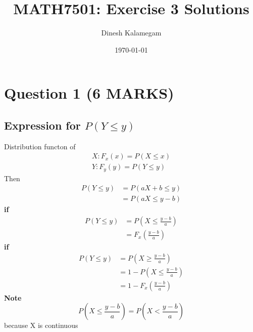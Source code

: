 \documentclass[11pt]{article}
\begin{document}
\title{MATH7501: Exercise 3 Solutions}
\author{Dinesh Kalamegam}
\date{\today}
\maketitle

\newtheorem{theorem}{Theorem}[section]
\newtheorem{definition}[theorem]{Defintion}
\newtheorem{proposition}[theorem]{Proposition}
\newtheorem{corollary}[theorem]{Corollary}

\section{Question 1 (6 MARKS)}
\subsection{Expression for $P(Y\leq y)$}
Distribution functon of
\begin{align*}
    X: F_{x}(x) = P(X \leq x) \\
    Y: F_{y}(y) = P(Y \leq y)
\end{align*}
Then
\begin{align*}
    P(Y \leq y ) &= P(aX+b \leq y) \\
                 &= P(aX \leq y-b)
\end{align*}
\textbf{if }
\begin{align*}
    P(Y \leq y ) &= P\left(X\leq \frac{y-b}{a}\right) \\
                 &= \boxed{ F_{x}\left(\frac{y-b}{a}\right)}
\end{align*}
\textbf{if }
\begin{align*}
    P(Y \leq y ) &= P(X\geq \frac{y-b}{a}) \\
                 &= 1- P(X\leq \frac{y-b}{a}) \\
                 &= \boxed{1- F_{x}\left(\frac{y-b}{a}\right)}
\end{align*}
\textbf{Note}
\begin{equation*}
    P\left(X\leq \frac{y-b}{a}\right) = P\left(X< \frac{y-b}{a}\right)
\end{equation*}
because X is continuous
\end{document}

